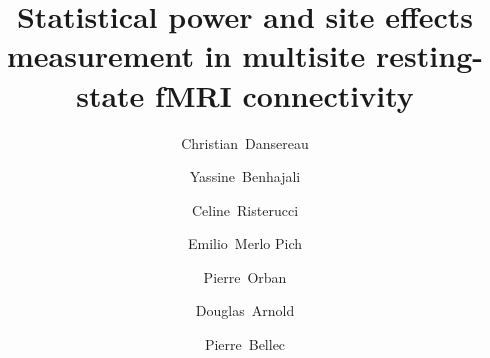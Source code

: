 \documentclass[authoryear]{elsarticle}
\begin{document}
\begin{frontmatter}
\title{Statistical power and site effects measurement in multisite resting-state fMRI connectivity}

\author[a,b]{Christian~Dansereau}
\author[a,c]{Yassine~Benhajali}
\author[d]{Celine~Risterucci}
\author[d]{Emilio~Merlo Pich}
\author[a]{Pierre~Orban}
\author[e]{Douglas~Arnold}
\author[a,b]{Pierre~Bellec}
\address[a]{Centre de Recherche de l'Institut Universitaire de G\'eriatrie de Montr\'eal, Montr\'eal, CA}
\address[b]{Department of Computer Science and Operations Research, University of Montreal, Montreal, CA}
\address[c]{D\'epartement d'anthropologie, Universit\' de Montr\'eal, Montr\'eal, CA}
\address[d]{Clinical Imaging, pRED, F.Hoffman-La Roche, Basel, CH}
\address[e]{NeuroRx inc., Montr\'eal, CA}


%


\end{frontmatter}
\end{document}
